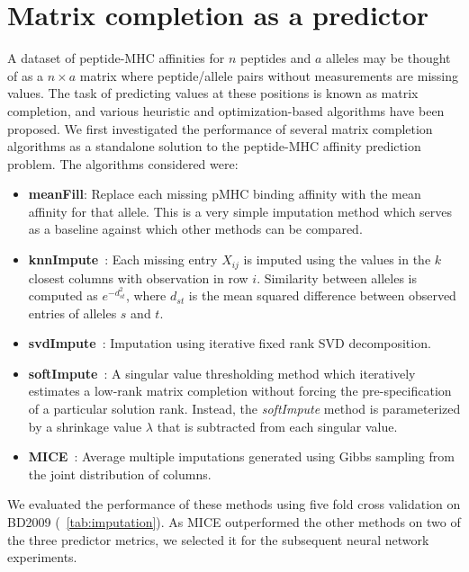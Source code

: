 \section{Matrix completion as a predictor}

A dataset of peptide-MHC affinities for $n$ peptides and $a$ alleles may be thought of as a $n \times a$ matrix where peptide/allele pairs without measurements are missing values. The task of predicting values at these positions is known as matrix completion, and various heuristic and optimization-based algorithms have been proposed. We first investigated the performance of several matrix completion algorithms as a standalone solution to the peptide-MHC affinity prediction problem. The algorithms considered were:

\begin{itemize}
\item {\bf meanFill}: Replace each missing pMHC binding affinity with the mean affinity for that allele. This is a very simple imputation method which serves as a baseline against which other methods can be compared. 

\item {\bf knnImpute}~\cite{Troyanskaya_2001}: Each missing entry $X_{ij}$ is imputed using the values in the $k$ closest columns with observation in row $i$.  Similarity between alleles is computed as $e^{-d_{st}^2}$, where $d_{st}$ is the mean squared difference between observed entries of alleles $s$ and $t$. 

\item {\bf svdImpute}~\cite{Troyanskaya_2001}: Imputation using iterative fixed rank SVD decomposition. 

\item {\bf softImpute}~\cite{Mazumder2010SpectralMatrices}: A singular value thresholding method which iteratively estimates a low-rank matrix completion without forcing the pre-specification of a particular solution rank. Instead, the {\it softImpute} method is parameterized by a shrinkage value $\lambda$ that is subtracted from each singular value. 

\item {\bf MICE}~\cite{Azur_2011}: Average multiple imputations generated using Gibbs sampling from the joint distribution of columns. 
\end{itemize}

We evaluated the performance of these methods using five fold cross validation on BD2009 (~\ref{tab:imputation}). As MICE outperformed the other methods on two of the three predictor metrics, we selected it for the subsequent neural network experiments.

